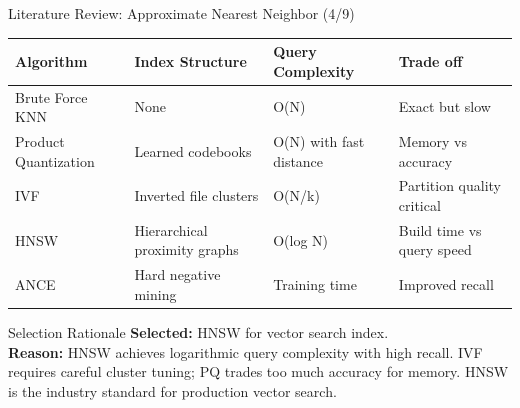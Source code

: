 \documentclass[aspectratio=169,xcolor=dvipsnames]{beamer}
\begin{document}
\begin{frame}{Literature Review: Approximate Nearest Neighbor (4/9)}
    \scriptsize
    \begin{table}
        \centering
        \renewcommand{\arraystretch}{1.1}
        \begin{tabular}{p{}|p{}|p{}|p{}}
        \toprule
        \textbf{Algorithm} & \textbf{Index Structure} & \textbf{Query Complexity} & \textbf{Trade off} \\
        \midrule
        Brute Force KNN & None & O(N) & Exact but slow \\
        \midrule
        Product Quantization \cite{jegou2011product} & Learned codebooks & O(N) with fast distance & Memory vs accuracy \\
        \midrule
        IVF & Inverted file clusters & O(N/k) & Partition quality critical \\
        \midrule
        HNSW \cite{malkov2018efficient} & Hierarchical proximity graphs & O(log N) & Build time vs query speed \\
        \midrule
        ANCE \cite{xiong2021approximate} & Hard negative mining & Training time & Improved recall \\
        \bottomrule
        \end{tabular}
    \end{table}
    
    \vspace{0.3em}
    \begin{block}{Selection Rationale}
        \textbf{Selected:} HNSW for vector search index. \\
        \textbf{Reason:} HNSW achieves logarithmic query complexity with high recall. IVF requires careful cluster tuning; PQ trades too much accuracy for memory. HNSW is the industry standard for production vector search.
    \end{block}
\end{frame}
\end{document}
